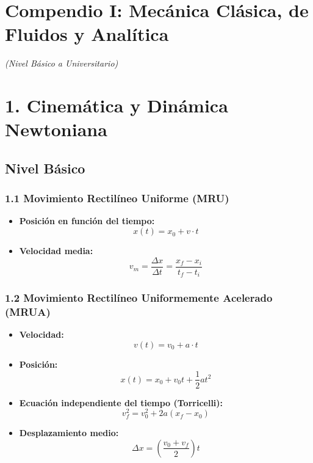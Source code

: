 \documentclass[11pt,a4paper]{article}
\begin{document}
\section*{Compendio I: Mecánica Clásica, de Fluidos y Analítica}

\textit{(Nivel Básico a Universitario)}

\section*{1. Cinemática y Dinámica Newtoniana}

\subsection*{Nivel Básico}

\subsubsection*{1.1 Movimiento Rectilíneo Uniforme (MRU)}

\begin{itemize}
  \item \textbf{Posición en función del tiempo:}
  \[
    x(t) = x_0 + v \cdot t
  \]
  \item \textbf{Velocidad media:}
  \[
    v_m = \frac{\Delta x}{\Delta t} = \frac{x_f - x_i}{t_f - t_i}
  \]
\end{itemize}

\subsubsection*{1.2 Movimiento Rectilíneo Uniformemente Acelerado (MRUA)}

\begin{itemize}
  \item \textbf{Velocidad:}
  \[
    v(t) = v_0 + a \cdot t
  \]
  \item \textbf{Posición:}
  \[
    x(t) = x_0 + v_0 t + \frac{1}{2} a t^2
  \]
  \item \textbf{Ecuación independiente del tiempo (Torricelli):}
  \[
    v_f^2 = v_0^2 + 2a (x_f - x_0)
  \]
  \item \textbf{Desplazamiento medio:}
  \[
    \Delta x = \left( \frac{v_0 + v_f}{2} \right) t
  \]
\end{itemize}
\end{document}
